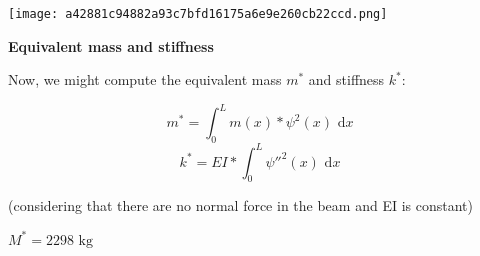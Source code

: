 \texttt{[image: a42881c94882a93c7bfd16175a6e9e260cb22ccd.png]}

\textbf{Equivalent mass and stiffness}

Now, we might compute the equivalent mass \(m^{*}\) and stiffness
\(k^{*}\):

\[ m^{*} = \int_{0}^{L} m(x) * \psi^2(x) \text{ d}x \]
\[ k^{*} = EI * \int_{0}^{L} \psi''^2(x) \text{ d}x \]

(considering that there are no normal force in the beam and EI is
constant)

\begin{Shaded}
\begin{Highlighting}[]

\OperatorTok{=} \OperatorTok{=}\NormalTok{()}\OperatorTok{*}
\end{Highlighting}
\end{Shaded}

\begin{Shaded}
\begin{Highlighting}[]
\OperatorTok{=}\OperatorTok{*}\OperatorTok{**}\OperatorTok{=}
\OperatorTok{=}\OperatorTok{*}\OperatorTok{**}\OperatorTok{=}\OperatorTok{*} 

\CharTok{\{\{}\SpecialStringTok{*\}\} = }\SpecialCharTok{\{}\SpecialStringTok{ }\CharTok{\textbackslash{}\textbackslash{}}\CharTok{\{\{}\NormalTok{))}
\CharTok{\{\{}\SpecialStringTok{*\}\} = }\SpecialCharTok{\{}\OperatorTok{/}\CharTok{\textbackslash{}\textbackslash{}}\CharTok{\{\{}\NormalTok{))}
\end{Highlighting}
\end{Shaded}

$M^{*} = 2298 \text{ kg}$

